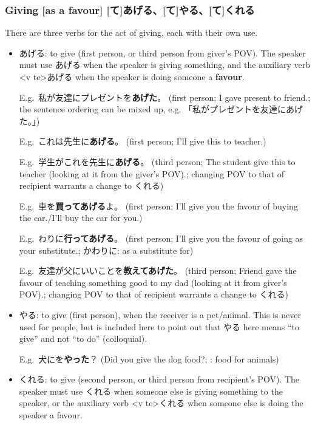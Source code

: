 \documentclass[../nihongo-gakushuu-kyouzai-grammar.tex]{subfiles}
\begin{document}
\subsubsection{Giving [as a favour] [て]あげる、[て]やる、[て]くれる} \label{sec:giving}
There are three verbs for the act of giving, each with their own use.
\begin{itemize}
    \item あげる: to give (first person, or third person from giver's POV). The speaker must use あげる when the speaker is giving something, and the auxiliary verb <v te>あげる when the speaker is doing someone a \textbf{favour}.

    E.g.\ 私が友達にプレゼントを\textbf{あげた}。 (first person; I gave present to friend.; the sentence ordering can be mixed up, e.g. 「私がプレゼントを友達にあげた。」)

    E.g.\ これは先生に\textbf{あげる}。 (first person; I'll give this to teacher.)

    E.g.\ 学生がこれを先生に\textbf{あげる}。 (third person; The student give this to teacher (looking at it from the giver's POV).; changing POV to that of recipient warrants a change to くれる)

    E.g.\ 車を\textbf{買ってあげる}よ。 (first person; I'll give you the favour of buying the car./I'll buy the car for you.)

    E.g.\ わりに\textbf{行ってあげる}。 (first person; I'll give you the favour of going as your substitute.; かわりに: as a substitute for)

    E.g.\ 友達が父にいいことを\textbf{教えてあげた}。 (third person; Friend gave the favour of teaching something good to my dad (looking at it from giver's POV).; changing POV to that of recipient warrants a change to くれる)
    \item やる: to give (first person), when the receiver is a pet/animal. This is never used for people, but is included here to point out that やる here means ``to give'' and not ``to do'' (colloquial).

    E.g.\ 犬にを\textbf{やった}？ (Did you give the dog food?; : food for animals)
    \item くれる: to give (second person, or third person from recipient's POV). The speaker must use くれる when someone else is giving something to the speaker, or the auxiliary verb <v te>くれる when someone else is doing the speaker a favour.



\end{itemize}
\end{document}
